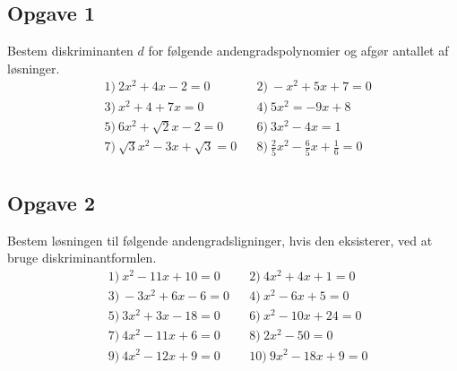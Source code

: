 \documentclass[12pt]{article}
\begin{document}
\subsection*{Opgave 1}

Bestem diskriminanten $d$ for følgende andengradspolynomier og afgør antallet af løsninger. 
\begin{align*}
	&1) \ 2x^2 + 4x - 2 = 0    &   &2) \ -x^2 + 5x + 7 = 0    \\
	&3) \ x^2 + 4 + 7x = 0    &   &4) \ 5x^2 = -9x + 8    \\
	&5) \ 6x^2 + \sqrt{2}x - 2 = 0    &   &6) \ 3x^2 - 4x = 1    \\
	&7) \ \sqrt{3}x^2 -3x + \sqrt{3} = 0    &   &8) \ \frac{2}{5}x^2 - \frac{6}{5}x + \frac{1}{6} = 0    \\
\end{align*}

\subsection*{Opgave 2}
Bestem løsningen til følgende andengradsligninger, hvis den eksisterer, ved at bruge diskriminantformlen.
\begin{align*}
	&1) \ x^2 - 11x + 10 = 0 &  &2) \ 4x^2 + 4x + 1 = 0\\
	&3) \ -3x^2 + 6x - 6 = 0 &  &4) \ x^2 - 6x + 5 = 0\\
	&5) \ 3x^2 + 3x - 18 = 0 &  &6) \ x^2 - 10x + 24 = 0\\
	&7) \ 4x^2 - 11x + 6 = 0  &  &8) \ 2x^2 - 50 = 0\\
	&9) \ 4x^2 - 12x + 9 = 0 &  &10) \ 9x^2 - 18x + 9 = 0\\	
 \end{align*}
\end{document}
